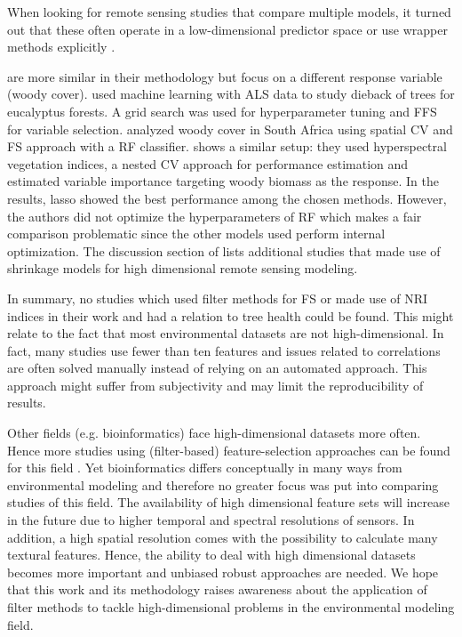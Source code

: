 \documentclass[final]{IEEEtran}
\begin{document}
When looking for remote sensing studies that compare multiple models, it turned out that these often operate in a low-dimensional predictor space \cite{xu2019} or use wrapper methods explicitly \cite{georganos2018}.

\cite{shendryk2016, ludwig2019} are more similar in their methodology but focus on a different response variable (woody cover).
\cite{shendryk2016} used machine learning with \ac{ALS} data to study dieback of trees for eucalyptus forests.
A grid search was used for hyperparameter tuning and \ac{FFS} for variable selection.
\cite{ludwig2019} analyzed woody cover in South Africa using spatial \ac{CV} and \ac{FS} approach \cite{meyer2018} with a RF classifier.
\cite{zandler2015} shows a similar setup: they used hyperspectral vegetation indices, a nested CV approach for performance estimation and estimated variable importance targeting woody biomass as the response.
In the results, lasso showed the best performance among the chosen methods.
However, the authors did not optimize the hyperparameters of RF which makes a fair comparison problematic since the other models used perform internal optimization.
The discussion section of \cite{zandler2015} lists additional studies that made use of shrinkage models for high dimensional remote sensing modeling.

In summary, no studies which used filter methods for \ac{FS} or made use of \ac{NRI} indices in their work and had a relation to tree health could be found.
This might relate to the fact that most environmental datasets are not high-dimensional.
In fact, many studies use fewer than ten features and issues related to correlations are often solved manually instead of relying on an automated approach.
This approach might suffer from subjectivity and may limit the reproducibility of results.

Other fields (e.g. bioinformatics) face high-dimensional datasets more often.
Hence more studies using (filter-based) feature-selection approaches can be found for this field \cite{guo2019, radovic2017}.
Yet bioinformatics differs conceptually in many ways from environmental modeling and therefore no greater focus was put into comparing studies of this field.
The availability of high dimensional feature sets will increase in the future due to higher temporal and spectral resolutions of sensors.
In addition, a high spatial resolution comes with the possibility to calculate many textural features.
Hence, the ability to deal with high dimensional datasets becomes more important and unbiased robust approaches are needed.
We hope that this work and its methodology raises awareness about the application of filter methods to tackle high-dimensional problems in the environmental modeling field.
\end{document}
